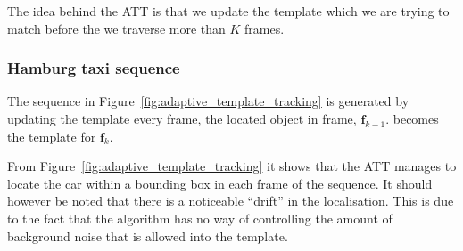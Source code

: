 The idea behind the ATT is that we update the template which we are trying to
match before the we traverse more than
$K$ frames.

\subsubsection{Hamburg taxi sequence}
The sequence in Figure~\ref{fig:adaptive_template_tracking} is generated by
updating the template every frame, the located object in frame,
$\mathbf{f}_{k-1}$. becomes the template for $\mathbf{f}_k$.

From Figure~\ref{fig:adaptive_template_tracking} it shows that the ATT manages
to locate the car within a bounding box in each frame of the sequence. It should
however be noted that there is a noticeable ``drift'' in
the localisation. 
This is due to the fact that the algorithm has no way of controlling the amount of
background noise that is allowed into the template.

